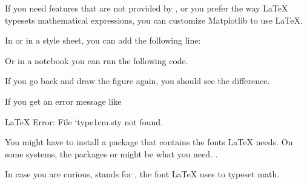 \documentclass[letterpaper,10pt,english]{sphinxmanual}
\begin{document}
If you need features that are not provided by , or you prefer the way LaTeX typesets mathematical expressions, you can customize Matplotlib to use LaTeX.

In  or in a style sheet, you can add the following line:

\begin{sphinxVerbatim}[commandchars=\\\{\}]
         
\end{sphinxVerbatim}

Or in a notebook you can run the following code.

\begin{sphinxVerbatim}[commandchars=\\\{\}]
\PYG{p}{[}\PYG{p}{]}  
\end{sphinxVerbatim}

\begin{sphinxVerbatim}[commandchars=\\\{\}]
\PYG{p}{[}\PYG{p}{]}  
\end{sphinxVerbatim}

If you go back and draw the figure again, you should see the difference.

If you get an error message like

\begin{sphinxVerbatim}[commandchars=\\\{\}]
LaTeX Error: File `type1cm.sty\PYGZsq{} not found.
\end{sphinxVerbatim}

You might have to install a package that contains the fonts LaTeX needs.  On some systems, the packages  or  might be what you need.  .

In case you are curious,  stands for , the font LaTeX uses to typeset math.
\end{document}
